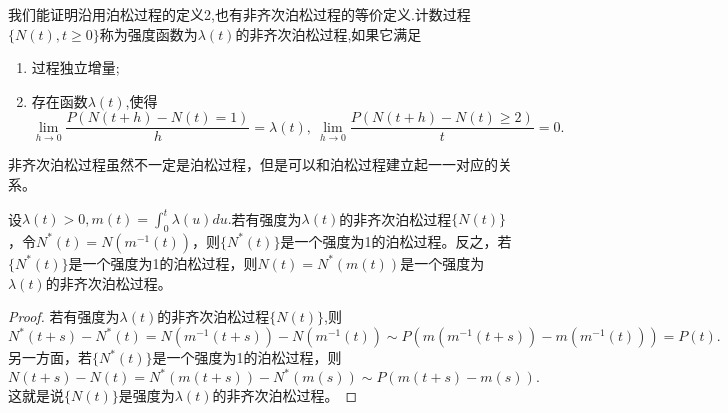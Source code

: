 \documentclass[lang=cn,10pt]{elegantbook}
\begin{document}
	\begin{definition}[非齐次泊松过程2]
		我们能证明沿用泊松过程的定义2,也有非齐次泊松过程的等价定义.计数过程\(\{N(t),t\ge0\}\)称为强度函数为\(\lambda(t)\)的非齐次泊松过程,如果它满足
		\begin{enumerate}
			\item 过程独立增量;
			\item 存在函数\(\lambda(t)\),使得
			\[\lim_{h\to 0}\frac{P(N(t+h)-N(t)=1)}{h}=\lambda(t),\ \lim_{h\to 0}\frac{P(N(t+h)-N(t)\ge 2)}{t}=0.\]
		\end{enumerate}
	\end{definition}
	非齐次泊松过程虽然不一定是泊松过程，但是可以和泊松过程建立起一一对应的关系。
	\begin{theorem}
		设\(\lambda(t)>0,m(t)=\int_0^t\lambda(u)du.\)若有强度为\(\lambda(t)\)的非齐次泊松过程\(\{N(t)\}\)，令\(N^*(t)=N(m^{-1}(t))\)，则\(\{N^*(t)\}\)是一个强度为1的泊松过程。反之，若\(\{N^*(t)\}\)是一个强度为1的泊松过程，则\(N(t)=N^*(m(t))\)是一个强度为\(\lambda(t)\)的非齐次泊松过程。
	\end{theorem}
	\begin{proof}
		若有强度为\(\lambda(t)\)的非齐次泊松过程\(\{N(t)\}\),则
		\[N^*(t+s)-N^*(t)=N(m^{-1}(t+s))-N(m^{-1}(t))\sim P(m(m^{-1}(t+s))-m(m^{-1}(t)))=P(t).\]
		另一方面，若\(\{N^*(t)\}\)是一个强度为1的泊松过程，则
		\[N(t+s)-N(t)=N^*(m(t+s))-N^*(m(s))\sim P(m(t+s)-m(s)).\]
		这就是说\(\{N(t)\}\)是强度为\(\lambda(t)\)的非齐次泊松过程。
	\end{proof}
\end{document}
